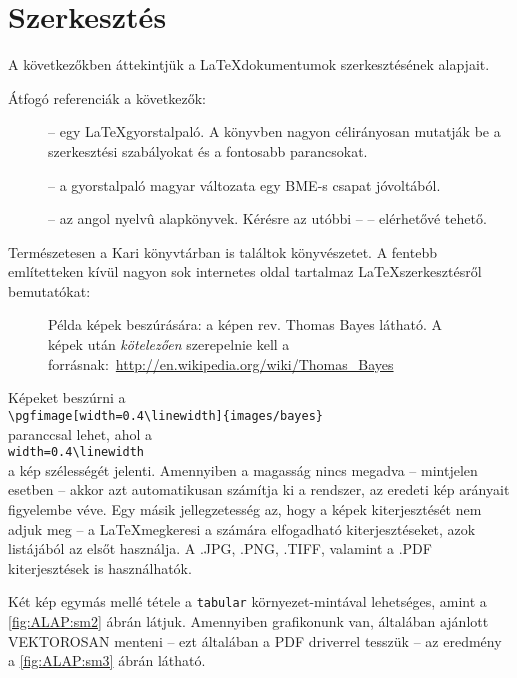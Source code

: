 \section{Szerkesztés}\label{sec:ALAP:szerkeszt}

A következőkben áttekintjük a \LaTeX dokumentumok szerkesztésének alapjait.

Átfogó referenciák a következők:
\begin{description}%
	\item[\cite{LatexNotSoShort}] -- egy \LaTeX gyorstalpaló. A könyvben nagyon
	  célirányosan mutatják be a szerkesztési szabályokat és a fontosabb parancsokat.
	\item[\cite{LatexNotSoShortHU}] -- a gyorstalpaló magyar változata egy BME-s
	  csapat jóvoltából.
	\item[\cite{Doob95,MittelbachEtAl04}] -- az angol nyelvû alapkönyvek. Kérésre az
	  utóbbi -- \cite{MittelbachEtAl04} -- elérhetővé tehető.
\end{description}
Természetesen a Kari könyvtárban is találtok könyvészetet. A fentebb említetteken kívül nagyon sok internetes oldal tartalmaz \LaTeX szerkesztésről bemutatókat:


\begin{figure}[t]
  \centering
  \caption[Példa képek beszúrására]%
  {Példa képek beszúrására: a képen rev. Thomas Bayes látható. A képek után {\em kötelezően} szerepelnie kell a forrásnak:~\url{http://en.wikipedia.org/wiki/Thomas_Bayes}}
  \label{fig:ALAP:sm1}
\end{figure}

Képeket beszúrni a\\
 \verb+\pgfimage[width=0.4\linewidth]{images/bayes}+\\
paranccsal lehet, ahol a\\
\verb+width=0.4\linewidth+ \\
a kép szélességét jelenti. Amennyiben a magasság nincs megadva -- mintjelen esetben -- akkor azt automatikusan számítja ki a rendszer, az eredeti kép arányait figyelembe véve.
Egy másik jellegzetesség az, hogy a képek kiterjesztését nem adjuk meg -- a \LaTeX megkeresi a számára elfogadható kiterjesztéseket, azok listájából az elsőt használja. A .JPG, .PNG, .TIFF, valamint a .PDF kiterjesztések is használhatók.

Két kép egymás mellé tétele a \verb+tabular+ környezet-mintával lehetséges, amint a \ref{fig:ALAP:sm2} ábrán látjuk.
Amennyiben grafikonunk van, általában ajánlott VEKTOROSAN menteni -- ezt általában a PDF driverrel tesszük -- az eredmény a \ref{fig:ALAP:sm3} ábrán látható.

